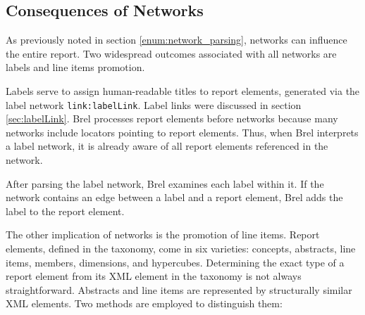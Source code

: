


\subsection{Consequences of Networks}

As previously noted in section \ref{enum:network_parsing}, networks can influence the entire report.
Two widespread outcomes associated with all networks are labels and line items promotion.

Labels serve to assign human-readable titles to report elements, generated via the label network \texttt{link:labelLink}.
Label links were discussed in section \ref{sec:labelLink}.
Brel processes report elements before networks because many networks include locators pointing to report elements.
Thus, when Brel interprets a label network, it is already aware of all report elements referenced in the network.

After parsing the label network, Brel examines each label within it.
If the network contains an edge between a label and a report element, Brel adds the label to the report element.

The other implication of networks is the promotion of line items.
Report elements, defined in the taxonomy, come in six varieties: concepts, abstracts, line items, members, dimensions, and hypercubes.
Determining the exact type of a report element from its XML element in the taxonomy is not always straightforward.
Abstracts and line items are represented by structurally similar XML elements.
Two methods are employed to distinguish them:

